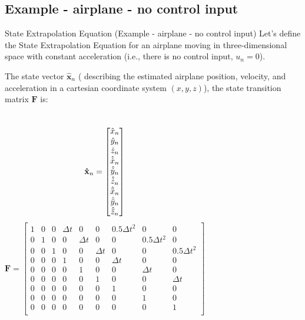 \subsection{Example - airplane - no control input}
\begin{frame}{State Extrapolation Equation (Example - airplane - no control input)}
Let's define the State Extrapolation Equation for an airplane moving in three-dimensional space with constant acceleration (i.e., there is no control input, $u_n = 0$).

The state vector $\mathbf{\hat{x}}_n$ ( describing the estimated airplane position, velocity, and acceleration in a cartesian coordinate system $(x, y, z)$), the state transition matrix $\mathbf{F}$ is:
\begin{columns}
           \begin{equation*}
            \centering
            \mathbf{\hat{x}}_n =
            \begin{bmatrix}
            \hat{x}_n\\
            \hat{y}_n\\
            \hat{z}_n\\
            \hat{\dot{x}}_n\\
            \hat{\dot{y}}_n\\
            \hat{\dot{z}}_n\\
            \hat{\ddot{x}}_n\\
            \hat{\ddot{y}}_n\\
            \hat{\ddot{z}}_n\\
            \end{bmatrix}
            \end{equation*}
            $$\mathbf{F} =
\begin{bmatrix}
1 & 0 & 0 & \Delta t & 0 & 0 & 0.5\Delta t^2 & 0 & 0 \\
0 & 1 & 0 & 0 & \Delta t & 0 & 0 & 0.5\Delta t^2 & 0 \\
0 & 0 & 1 & 0 & 0 & \Delta t & 0 & 0 & 0.5\Delta t^2 \\
0 & 0 & 0 & 1 & 0 & 0 & \Delta t & 0 & 0 \\
0 & 0 & 0 & 0 & 1 & 0 & 0 & \Delta t & 0 \\
0 & 0 & 0 & 0 & 0 & 1 & 0 & 0 & \Delta t \\
0 & 0 & 0 & 0 & 0 & 0 & 1 & 0 & 0 \\
0 & 0 & 0 & 0 & 0 & 0 & 0 & 1 & 0 \\
0 & 0 & 0 & 0 & 0 & 0 & 0 & 0 & 1 \\
\end{bmatrix}$$ 
\end{columns}


\end{frame}
